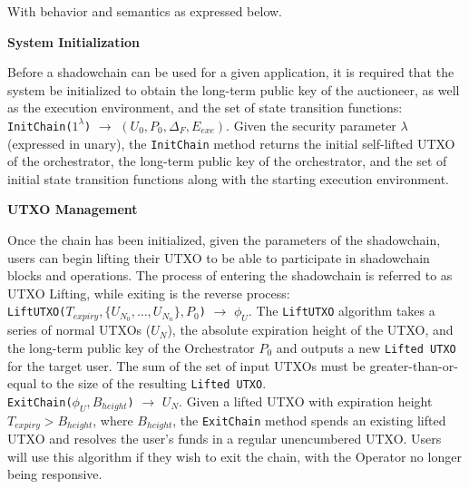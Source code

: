\documentclass[10pt,a4paper]{article}
\theoremstyle{definition}
\begin{document}
With behavior and semantics as expressed below. \\

\begin{center}
    \textbf{System Initialization}
\end{center}

Before a shadowchain can be used for a given application, it is required that
the system be initialized to obtain the long-term public key of the auctioneer,
as well as the execution environment, and the set of state transition
functions: \\

\texttt{InitChain($1^{\lambda}$)} $\rightarrow$ $(U_{0}, P_{0}, \Delta_F,
E_{exe})$. Given the security parameter $\lambda$ (expressed in unary), the
\texttt{InitChain} method returns the initial self-lifted UTXO of the
orchestrator, the long-term public key of the orchestrator, and the set of
initial state transition functions along with the starting execution
environment.


\begin{center}
    \textbf{UTXO Management}
\end{center}

Once the chain has been initialized, given the parameters of the shadowchain,
users can begin lifting their UTXO to be able to participate in shadowchain
blocks and operations. The process of entering the shadowchain is referred to as
UTXO Lifting, while exiting is the reverse process: \\

\texttt{LiftUTXO($T_{expiry}, \{U_{N_0}, \ldots, U_{N_n}\}, P_{0}$)}
$\rightarrow$ $\phi_{U}$. The \texttt{LiftUTXO} algorithm takes a series of
normal UTXOs ($U_N$), the absolute expiration height of the UTXO, and the
long-term public key of the Orchestrator $P_{0}$ and outputs a new
\texttt{Lifted UTXO} for the target user. The sum of the set of input UTXOs
must be greater-than-or-equal to the size of the resulting \texttt{Lifted
UTXO}. \\

\texttt{ExitChain($\phi_{U}, B_{height}$)} $\rightarrow$ $U_{N}$. Given a lifted
UTXO with expiration height $T_{expiry} > B_{height}$, where $B_{height}$, the
\texttt{ExitChain} method spends an existing lifted UTXO and resolves the
user's funds in a regular unencumbered UTXO. Users will use this algorithm if
they wish to exit the chain, with the Operator no longer being responsive. \\
\end{document}
